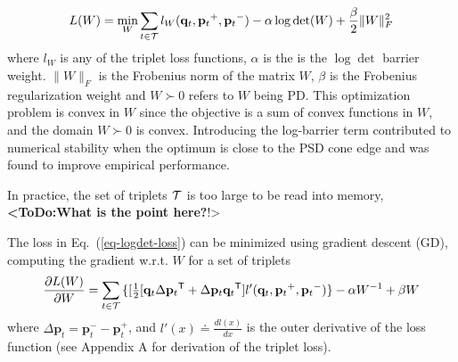 \documentclass[twoside,11pt]{article}
\newcommand\todo[1]{\textbf{<ToDo:#1}!>}
\newcommand\mat[1]{{#1}}
\renewcommand\vec[1]{\mathbf{#1}}
\newcommand{\T}{{}^\mathsf{T}}
\newcommand{\W}{\mat{W}}
\newcommand{\eqdef}{\doteq}
\newcommand{\frobsq}[1]{{\|#1\|_F^2}}
\newcommand{\frob}[1]{{\|#1\|_F}}
\newcommand{\ignore}[1]{}
\newcommand{\q}{{\vec{q}}}
\newcommand{\p}{{\vec{p}}}
\newcommand{\trip}{{t}}
\newcommand{\qt}{{\q_{\trip}}}
\newcommand{\pt}{{\p_{\trip}}}
\newcommand{\triplet}{(\qt, \pt^{+}, \pt^{-})}
\renewcommand{\eqref}[1]{Eq.~(\ref{#1})}
\begin{document}
\begin{equation}
\label{eq-logdet-loss}
L(W) = 
  \min_{\W} \sum_{\trip \in \cal{T}}  l_{\W}(\qt, \pt^+, \pt^-) - \alpha \log \det(\W) + \frac{\beta}{2} \frobsq{\W}
\end{equation}
where $l_{\W}$ is any of the triplet loss functions, $\alpha$ is the is the $\log\det$ barrier weight. $\frob{\W}$ is the Frobenius norm of the matrix $\W$, $\beta$ is the Frobenius regularization weight and $\W \succ 0$ refers to $\W$ being PD. This optimization problem is convex in $\W$ since the objective is a sum of convex functions in $\W$, and the domain $\W \succ 0$ is convex.
Introducing the log-barrier term contributed to numerical stability when the optimum is close to the PSD cone edge and was found to improve empirical performance.


\ignore{
\begin{eqnarray}
  \min_{\W}& \sum_{\trip=1}^{\cal{T}}  l_{\W}(\qt, \pt^+, \pt^-) + \frac{\beta}{2} \frobsq{\W}
 \\  \nonumber
   \rm{s.t.}& \W \succ 0 \quad,
\label{hingelt}
\end{eqnarray}
}

In practice, the set of triplets $\cal{T}$ is too large to be read into memory, \todo{What is the point here?}

\ignore{
Previous metric learning approaches \citep{OASIS, qianHD, qian}, solved the constrained optimization problem by SGD or stochastic mini-batch gradient steps, while repeatedly projecting back to the convex cone of PD matrices. This projection amounts to solving an eigendecomposition problem and is therefore costly in runtime. An alternative approach is to use a log-barrier term and avoid projecting onto the PD cone \citep{davis2007information,lego}, yielding}


The loss in \eqref{eq-logdet-loss} can be minimized using gradient descent (GD), computing the gradient w.r.t. $\W$ for a set of triplets
\begin{equation}
  \frac{\partial {L (\W)}}{\partial \W} = \sum\limits_{t\in \cal{T}}{\{
  [\tfrac{1}{2}[\q_{t}\Delta\p_{t}\T + \Delta\p_{t}\q_{t}\T]  }
  {l'}\triplet\} - \alpha \W^{-1} + \beta \W
  \label{gradMtx}
\end{equation}
where $\Delta\p_t = \p_t^- - \p_t^+$, and $l'(x) \eqdef \frac{d{l(x)}}{dx}$ is the outer derivative of the loss function (see Appendix A for derivation of the triplet loss). 
\end{document}
